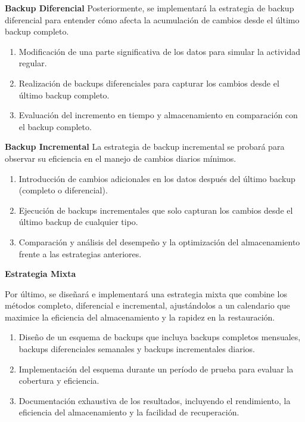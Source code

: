 \textbf{Backup Diferencial
}
Posteriormente, se implementará la estrategia de backup diferencial para entender cómo afecta la acumulación de cambios desde el último backup completo.

\begin{enumerate}
    \item Modificación de una parte significativa de los datos para simular la actividad regular.
    \item Realización de backups diferenciales para capturar los cambios desde el último backup completo.
    \item Evaluación del incremento en tiempo y almacenamiento en comparación con el backup completo.
\end{enumerate}

\textbf{Backup Incremental}
La estrategia de backup incremental se probará para observar su eficiencia en el manejo de cambios diarios mínimos.

\begin{enumerate}
    \item Introducción de cambios adicionales en los datos después del último backup (completo o diferencial).
    \item Ejecución de backups incrementales que solo capturan los cambios desde el último backup de cualquier tipo.
    \item Comparación y análisis del desempeño y la optimización del almacenamiento frente a las estrategias anteriores.
\end{enumerate}

\textbf{Estrategia Mixta}

Por último, se diseñará e implementará una estrategia mixta que combine los métodos completo, diferencial e incremental, ajustándolos a un calendario que maximice la eficiencia del almacenamiento y la rapidez en la restauración.

\begin{enumerate}
    \item Diseño de un esquema de backups que incluya backups completos mensuales, backups diferenciales semanales y backups incrementales diarios.
    \item Implementación del esquema durante un período de prueba para evaluar la cobertura y eficiencia.
    \item Documentación exhaustiva de los resultados, incluyendo el rendimiento, la eficiencia del almacenamiento y la facilidad de recuperación.
\end{enumerate}